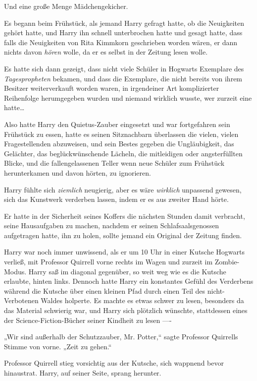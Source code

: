 {Und eine große Menge Mädchengekicher.

Es begann beim Frühstück, als jemand Harry gefragt hatte, ob die Neuigkeiten gehört hatte, und Harry ihn schnell unterbrochen hatte und gesagt hatte, dass falls die Neuigkeiten von Rita Kimmkorn geschrieben worden wären, er dann nichts davon \emph{hören} wolle, da er es selbst in der Zeitung lesen wolle.

Es hatte sich dann gezeigt, dass nicht viele Schüler in Hogwarts Exemplare des \emph{Tagespropheten} bekamen, und dass die Exemplare, die nicht bereits von ihrem Besitzer weiterverkauft worden waren, in irgendeiner Art komplizierter Reihenfolge herumgegeben wurden und niemand wirklich wusste, wer zurzeit eine hatte…

Also hatte Harry den Quietus-Zauber eingesetzt und war fortgefahren sein Frühstück zu essen, hatte es seinen Sitznachbarn überlassen die vielen, vielen Fragestellenden abzuweisen, und sein Bestes gegeben die Ungläubigkeit, das Gelächter, das beglückwünschende Lächeln, die mitleidigen oder angsterfüllten Blicke, und die fallengelassenen Teller wenn neue Schüler zum Frühstück herunterkamen und davon hörten, zu ignorieren.

Harry fühlte sich \emph{ziemlich} neugierig, aber es wäre \emph{wirklich} unpassend gewesen, sich das Kunstwerk verderben lassen, indem er es aus zweiter Hand hörte.

Er hatte in der Sicherheit seines Koffers die nächsten Stunden damit verbracht, seine Hausaufgaben zu machen, nachdem er seinen Schlafsaalsgenossen aufgetragen hatte, ihn zu holen, sollte jemand ein Original der Zeitung finden.

Harry war noch immer unwissend, als er um 10 Uhr in einer Kutsche Hogwarts verließ, mit Professor Quirrell vorne rechts im Wagen und zurzeit im Zombie-Modus. Harry saß im diagonal gegenüber, so weit weg wie es die Kutsche erlaubte, hinten links. Dennoch hatte Harry ein konstantes Gefühl des Verderbens während die Kutsche über einen kleinen Pfad durch einen Teil des nicht-Verbotenen Waldes holperte. Es machte es etwas schwer zu lesen, besonders da das Material schwierig war, und Harry sich plötzlich wünschte, stattdessen eines der Science-Fiction-Bücher seiner Kindheit zu lesen ----

„Wir sind außerhalb der Schutzzauber, Mr. Potter,“ sagte Professor Quirrells Stimme von vorne. „Zeit zu gehen.“

Professor Quirrell stieg vorsichtig aus der Kutsche, sich wappnend bevor hinaustrat. Harry, auf seiner Seite, sprang herunter.

}
